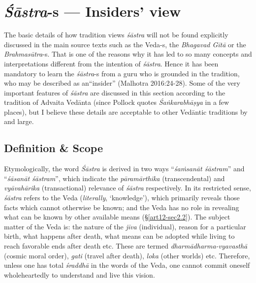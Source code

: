 \section{{{\sl\bfseries Śāstra}\relax}-s --- Insiders' view}\label{art12-sec2}

The basic details of how tradition views {\sl śāstra} will not be found explicitly discussed in the main source texts such as the Veda-s, the {\sl Bhagavad Gītā} or the {\sl Brahmasūtra}-s. That is one of the reasons why it has led to so many concepts and interpretations different from the intention of {\sl śāstra}. Hence it has been mandatory to learn the {\sl śāstra}-s from a guru who is grounded in the tradition, who may be described as an\break ``insider'' (Malhotra 2016:24-28). Some of the very important features of {\sl śāstra} are discussed in this section according to the tradition of Advaita Vedānta (since Pollock quotes {\sl Śaṅkarabhāṣya} in a few places), but I believe these details are acceptable to other Vedāntic traditions by and large.\\[-20pt]

\subsection{Definition \& Scope}\label{art12-sec2.1}

Etymologically, the word {\sl Śāstra} is derived in two ways ``{\sl śaṁsanāt śāstram}'' and ``{\sl śāsanāt śāstram}'', which indicate the {\sl pāramārthika} (transcendental) and {\sl vyāvahārika} (transactional) relevance of {\sl śāstra} respectively. In its restricted sense, {\sl śāstra} refers to the Veda ({\sl literally}, `knowledge'), which primarily reveals those facts which cannot otherwise be known; and the Veda has no role in revealing what can be known by other available means (\S\ref{art12-sec2.2}). The subject matter of the Veda is: the nature of the {\sl jīva} (individual), reason for a particular birth, what happens after death, what means can be adopted while living to reach favorable ends after death etc. These are termed {\sl dharmādharma-vyavasthā} (cosmic moral order), {\sl gati} (travel after death), {\sl loka} (other worlds) etc. Therefore, unless one has total {\sl śraddhā} in the words of the Veda, one cannot commit oneself wholeheartedly to understand and live this vision. 

